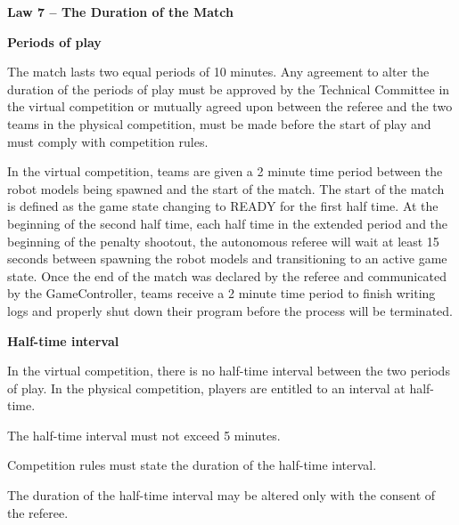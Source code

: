 \clearpage
\sffamily
{\bfseries\color[rgb]{0.4,0.4,0.4}
Law 7 -- The Duration of the Match}
{}

\bigskip

{\bfseries Periods of play }

\headlinebox

The match lasts two equal periods of 10 minutes.
Any agreement to alter the duration of the periods of play must be approved by the Technical Committee in the virtual competition or mutually agreed upon between the referee and the two teams in the physical competition, must be made before
the start of play and must comply with competition rules.


  In the virtual competition, teams are given a 2 minute time period between the robot models being spawned
  and the start of the match.
  The start of the match is defined as the game state changing to READY for the
  first half time.
  At the beginning of the second half time, each half time in the extended
  period and the beginning of the penalty shootout,
  the autonomous referee will wait at least 15 seconds between spawning the robot models
  and transitioning to an active game state.
  Once the end of the match was declared by the referee and communicated by the
  GameController,
  teams receive a 2 minute time period to finish writing logs and properly shut
  down their program before the process will be terminated.


\bigskip

{\bfseries Half-time interval}

\headlinebox

In the virtual competition, there is no half-time interval between the two periods of play.
In the physical competition, players are entitled to an interval at half-time.

The half-time interval must not exceed 5 minutes.

Competition rules must state the duration of the half-time interval.

The duration of the half-time interval may be altered only with the consent of the referee.

